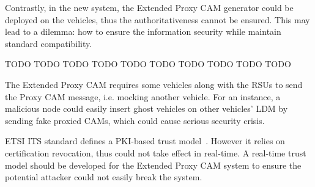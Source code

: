 Contrastly, in the new system, the Extended Proxy CAM generator could be deployed on the vehicles, thus the authoritativeness cannot be ensured.
This may lead to a dilemma: how to ensure the information security while maintain standard compatibility.

TODO TODO TODO TODO TODO TODO TODO TODO TODO TODO

The Extended Proxy CAM requires some vehicles along with the RSUs to send the Proxy CAM message, i.e. mocking another vehicle.
For an instance, a malicious node could easily insert ghost vehicles on other vehicles' LDM by sending fake proxied CAMs, which could cause serious security crisis.

ETSI ITS standard defines a PKI-based trust model~\cite{etsi2013103}. However it relies on certification revocation, thus could not take effect in real-time.
A real-time trust model should be developed for the Extended Proxy CAM system to ensure the potential attacker could not easily break the system.
